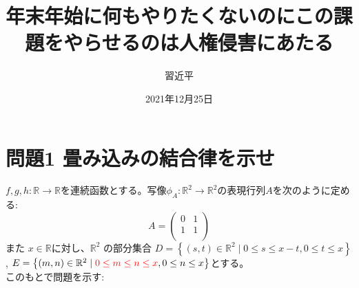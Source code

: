 \documentclass[dvipdfmx]{jreport}
\begin{document}
\title{年末年始に何もやりたくないのにこの課題をやらせるのは人権侵害にあたる}
\author{習近平}
\date{2021年12月25日}
\maketitle
\newpage
\tableofcontents
{}
\setcounter{chapter}{3}
\newpage
\section{問題1 畳み込みの結合律を示せ}
$f,g,h : \mathbb{R} \to \mathbb{R} $を連続函数とする。写像$\phi_A : \mathbb{R}^2 \to \mathbb{R}^2$の表現行列$A$を次のように定める:
$$
A = 
\left( 
\begin{array}{cc}
0 & 1\\
1 &1 \\
\end{array}
\right)
$$
また $x \in \mathbb{R} $に対し、$\mathbb{R}^2$ の部分集合 $D= \left\{ (s,t) \in \mathbb{R}^2 \mid 0 \le s \le x-t, 0 \le t \le x \right\}$,
$E= \left\{(m,n) \in \mathbb{R}^2 \mid \textcolor{red}{0 \le m \le n \le x} , 0 \le n \le x \right\}$とする。\\
このもとで問題を示す:
\end{document}
